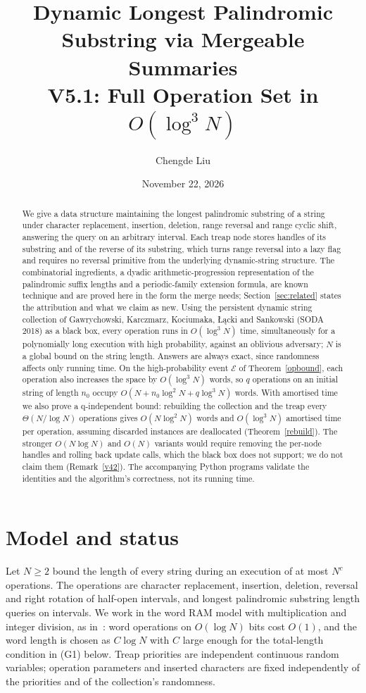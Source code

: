 ﻿\documentclass[11pt]{article}
\title{Dynamic Longest Palindromic Substring via Mergeable Summaries\\V5.1: Full Operation Set in $O(\log^3 N)$}
\author{Chengde Liu}
\date{November 22, 2026}
\theoremstyle{plain}
\theoremstyle{remark}
\begin{document}
\maketitle
\begin{abstract}
We give a data structure maintaining the longest palindromic substring of a string under character replacement, insertion, deletion, range reversal and range cyclic shift, answering the query on an arbitrary interval. Each treap node stores handles of its substring and of the reverse of its substring, which turns range reversal into a lazy flag and requires no reversal primitive from the underlying dynamic-string structure. The combinatorial ingredients, a dyadic arithmetic-progression representation of the palindromic suffix lengths and a periodic-family extension formula, are known technique and are proved here in the form the merge needs; Section~\ref{sec:related} states the attribution and what we claim as new. Using the persistent dynamic string collection of Gawrychowski, Karczmarz, Kociumaka, {\L}\k{a}cki and Sankowski (SODA 2018) as a black box, every operation runs in $O(\log^3 N)$ time, simultaneously for a polynomially long execution with high probability, against an oblivious adversary; $N$ is a global bound on the string length. Answers are always exact, since randomness affects only running time. On the high-probability event $\mathcal E$ of Theorem~\ref{opbound}, each operation also increases the space by $O(\log^3N)$ words, so $q$ operations on an initial string of length $n_0$ occupy $O(N+n_0\log^2N+q\log^3N)$ words. With amortised time we also prove a q-independent bound: rebuilding the collection and the treap every $\Theta(N/\log N)$ operations gives $O(N\log^2N)$ words and $O(\log^3N)$ amortised time per operation, assuming discarded instances are deallocated (Theorem~\ref{rebuild}). The stronger $O(N\log N)$ and $O(N)$ variants would require removing the per-node handles and rolling back update calls, which the black box does not support; we do not claim them (Remark~\ref{v42}). The accompanying Python programs validate the identities and the algorithm's correctness, not its running time.
\end{abstract}
\section{Model and status}\label{sec:model}
Let $N\ge2$ bound the length of every string during an execution of at most $N^c$ operations. The operations are character replacement, insertion, deletion, reversal and right rotation of half-open intervals, and longest palindromic substring length queries on intervals. We work in the word RAM model with multiplication and integer division, as in~\cite[App.~A]{GKK}: word operations on $O(\log N)$ bits cost $O(1)$, and the word length is chosen as $C\log N$ with $C$ large enough for the total-length condition in (G1) below. Treap priorities are independent continuous random variables; operation parameters and inserted characters are fixed independently of the priorities and of the collection's randomness.
\end{document}
